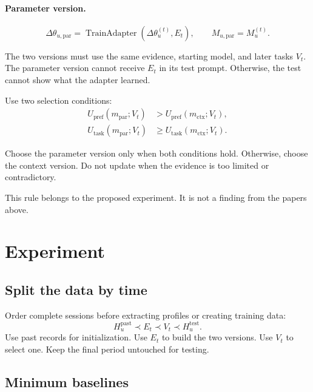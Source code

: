 \documentclass[11pt]{article}
\newcommand{\adapter}{\Delta\theta_u}
\newcommand{\memory}{M_u}
\newcommand{\prefscore}{U_{\mathrm{pref}}}
\newcommand{\taskscore}{U_{\mathrm{task}}}
\begin{document}
\paragraph{Parameter version.}
\begin{equation}
  \Delta\theta_{u,\mathrm{par}}
  =\operatorname{TrainAdapter}\!\left(\adapter^{(t)},E_t\right),
  \qquad
  M_{u,\mathrm{par}}=\memory^{(t)}.
\end{equation}

The two versions must use the same evidence, starting model, and later tasks
\(V_t\). The parameter version cannot receive \(E_t\) in its test prompt.
Otherwise, the test cannot show what the adapter learned.

Use two selection conditions:
\begin{equation}
  \begin{aligned}
  \prefscore(m_{\mathrm{par}};V_t)
    &> \prefscore(m_{\mathrm{ctx}};V_t),\\
  \taskscore(m_{\mathrm{par}};V_t)
    &\ge \taskscore(m_{\mathrm{ctx}};V_t).
  \end{aligned}
\end{equation}

Choose the parameter version only when both conditions hold. Otherwise, choose
the context version. Do not update when the evidence is too limited or
contradictory.

This rule belongs to the proposed experiment. It is not a finding from the
papers above.

\section{Experiment}

\subsection{Split the data by time}

Order complete sessions before extracting profiles or creating training data:
\begin{equation}
  H_u^{\mathrm{past}}
  \prec E_t
  \prec V_t
  \prec H_u^{\mathrm{test}}.
\end{equation}
Use past records for initialization. Use \(E_t\) to build the two versions.
Use \(V_t\) to select one. Keep the final period untouched for testing.

\subsection{Minimum baselines}
\end{document}
